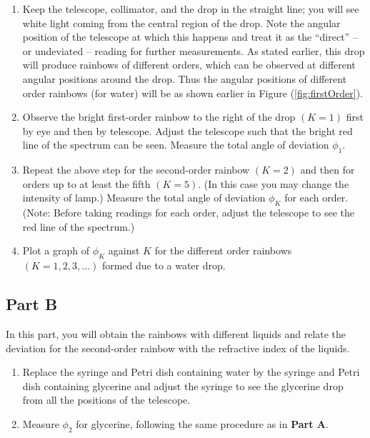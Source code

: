 \begin{refsection}
\begin{enumerate}
    \item Keep the telescope, collimator, and the drop in the straight line; you will see white light coming from the central region of the drop. Note the angular position of the telescope at which this happens and treat it as the ``direct'' -- or undeviated --  reading for further measurements. As stated earlier, this drop will produce rainbows of different orders, which can be observed at different angular positions around the drop. Thus the angular positions of different order rainbows (for water) will be as shown earlier in Figure (\ref{fig:firstOrder}). 

    \item Observe the bright first-order rainbow to the right of the drop $(K = 1)$ first by eye and then by telescope. Adjust the telescope such that the bright red line of the spectrum can be seen. Measure the total angle of deviation $\phi_1$. 
    
    \item Repeat the above step for the second-order rainbow $(K = 2)$ and then for orders up to at least the fifth $(K = 5)$. (In this case you may change the intensity of lamp.) Measure the total angle of deviation $\phi_K$ for each order. (Note: Before taking readings for each order, adjust the telescope to see the red line of the spectrum.) 
    
    \item Plot a graph of $\phi_K$ against $K$ for the different order rainbows $(K = 1, 2, 3, \hdots)$ formed due to a water drop.
\end{enumerate}


\subsection*{Part B}

In this part, you will obtain the rainbows with different liquids and relate the deviation for the second-order rainbow with the refractive index of the liquids.

\begin{enumerate}
    \item Replace the syringe and Petri dish containing water by the syringe and Petri dish containing glycerine and adjust the syringe to see the glycerine drop from all the positions of the telescope.
    
    \item Measure $\phi_2$ for glycerine, following the same procedure as in \textbf{Part A}.
    

\end{enumerate}
\end{refsection}
